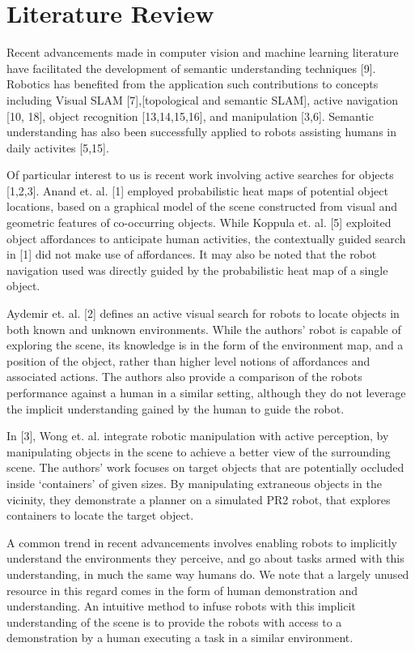 \chapter{Literature Review}



Recent advancements made in computer vision and machine learning literature have facilitated the development of semantic understanding techniques [9]. Robotics has benefited from the application such contributions to concepts including Visual SLAM [7],[topological and semantic SLAM], active navigation [10, 18], object recognition [13,14,15,16], and manipulation [3,6]. Semantic understanding has also been successfully applied to robots assisting humans in daily activites [5,15]. 

Of particular interest to us is recent work involving active searches for objects [1,2,3]. Anand et. al. [1] employed probabilistic heat maps of potential object locations, based on a graphical model of the scene constructed from visual and geometric features of co-occurring objects. While Koppula et. al. [5] exploited object affordances to anticipate human activities, the contextually guided search in [1] did not make use of affordances. It may also be noted that the robot navigation used was directly guided by the probabilistic heat map of a single object. 

Aydemir et. al. [2] defines an active visual search for robots to locate objects in both known and unknown environments. While the authors' robot is capable of exploring the scene, its knowledge is in the form of the environment map, and a position of the object, rather than higher level notions of affordances and associated actions. The authors also provide a comparison of the robots performance against a human in a similar setting, although they do not leverage the implicit understanding gained by the human to guide the robot. 

In [3], Wong et. al. integrate robotic manipulation with active perception, by manipulating objects in the scene to achieve a better view of the surrounding scene. The authors' work focuses on target objects that are potentially occluded inside `containers' of given sizes. By manipulating extraneous objects in the vicinity, they demonstrate a planner on a simulated PR2 robot, that explores containers to locate the target object. 

A common trend in recent advancements involves enabling robots to implicitly understand the environments they perceive, and go about tasks armed with this understanding, in much the same way humans do. We note that a largely unused resource in this regard comes in the form of human demonstration and understanding. An intuitive method to infuse robots with this implicit understanding of the scene is to provide the robots with access to a demonstration by a human executing a task in a similar environment.

